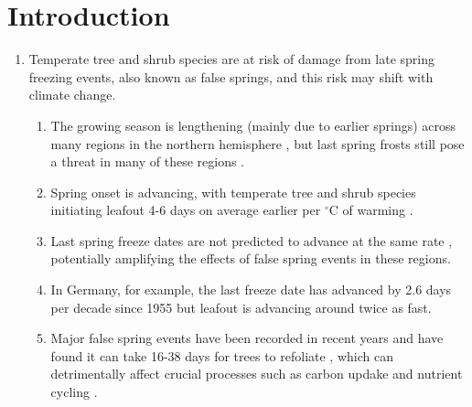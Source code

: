 \documentclass{article}\usepackage[]{graphicx}\usepackage[]{color}
\begin{document}
\section*{Introduction}
\begin{enumerate}
\item Temperate tree and shrub species are at risk of damage from late spring freezing events, also known as false springs, and this risk may shift with climate change.
\begin{enumerate}
\item The growing season is lengthening (mainly due to earlier springs) across many regions in the northern hemisphere \citep{Chen2005, Liu2006, Kukal2018}, but last spring frosts still pose a threat in many of these regions \citep{Wypych2016a}.
\item Spring onset is advancing, with temperate tree and shrub species initiating leafout 4-6 days on average earlier per $^{\circ}$C of warming \citep{Wolkovich2012, IPCC2014}.
\item Last spring freeze dates are not predicted to advance at the same rate \citep{Inouye2008, Martin2010, Labe2016, Sgubin2018}, potentially amplifying the effects of false spring events in these regions.
\item In Germany, for example, the last freeze date has advanced by 2.6 days per decade since 1955 \citep{Zohner2016} but leafout is advancing around twice as fast.
\item Major false spring events have been recorded in recent years and have found it can take 16-38 days for trees to refoliate \citep{Gu2008, Augspurger2009, Augspurger2013, Menzel2015}, which can detrimentally affect crucial processes such as carbon updake and nutrient cycling \citep{Hufkens2012, Richardson2013, Klosterman2018}.
\end{enumerate}



\end{enumerate}
\end{document}
